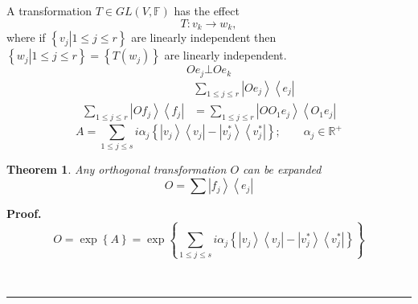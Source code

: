 \documentclass[aps,preprint]{revtex4}%
\newtheorem{theorem}{Theorem}
\newenvironment{proof}[1][Proof]{\noindent\textbf{#1.} }{\ \rule{0.5em}{0.5em}}
\begin{document}
A transformation $T\in GL\left(  V,\mathbb{F}\right)  $ has the effect
\begin{equation}
T:v_{k}\rightarrow w_{k},
\end{equation}
where if $\left\{  \left.  v_{j}\right\vert 1\leq j\leq r\right\}  $ are
linearly independent then $\left\{  \left.  w_{j}\right\vert 1\leq j\leq
r\right\}  =\left\{  T\left(  w_{j}\right)  \right\}  $ are linearly
independent.
\begin{equation}
Oe_{j}\bot Oe_{k}%
\end{equation}%
\begin{align}
&
{\textstyle\sum\limits_{1\leq j\leq r}}
\left\vert Oe_{j}\right\rangle \left\langle e_{j}\right\vert \\%
{\textstyle\sum\limits_{1\leq j\leq r}}
\left\vert Of_{j}\right\rangle \left\langle f_{j}\right\vert  & =%
{\textstyle\sum\limits_{1\leq j\leq r}}
\left\vert OO_{1}e_{j}\right\rangle \left\langle O_{1}e_{j}\right\vert
\end{align}%
\begin{equation}
A=\sum_{1\leq j\leq s}i\alpha_{j}\left\{  \left\vert v_{j}\right\rangle
\left\langle v_{j}\right\vert -\left\vert v_{j}^{\ast}\right\rangle
\left\langle v_{j}^{\ast}\right\vert \right\}  ;\qquad\alpha_{j}\in
\mathbb{R}^{+}\label{sa}%
\end{equation}


\begin{theorem}
Any orthogonal transformation $O$ can be expanded
\begin{equation}
O=\sum\left\vert f_{j}\right\rangle \left\langle e_{j}\right\vert
\end{equation}

\end{theorem}

\begin{proof}%
\begin{equation}
O=\exp\left\{  A\right\}  =\exp\left\{  \sum_{1\leq j\leq s}i\alpha
_{j}\left\{  \left\vert v_{j}\right\rangle \left\langle v_{j}\right\vert
-\left\vert v_{j}^{\ast}\right\rangle \left\langle v_{j}^{\ast}\right\vert
\right\}  \right\}
\end{equation}

\end{proof}
\end{document}
